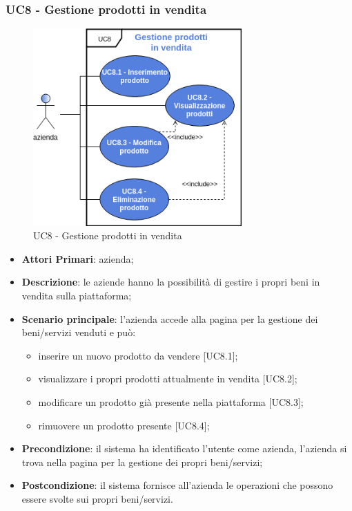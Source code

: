 \subsubsection{UC8 - Gestione prodotti in vendita}
\begin{figure}[h]
	\includegraphics[width=8cm]{res/images/UC8-Generale.png}
	\centering
	\caption{UC8 - Gestione prodotti in vendita}
\end{figure}
\begin{itemize}
	\item \textbf{Attori Primari}: azienda;
	\item \textbf{Descrizione}: le aziende hanno la possibilità di gestire i propri beni in vendita sulla piattaforma;
	\item \textbf{Scenario principale}: l'azienda accede alla pagina per la gestione dei beni/servizi venduti e può:
	\begin{itemize}
		\item inserire un nuovo prodotto da vendere [UC8.1];
		\item visualizzare i propri prodotti attualmente in vendita [UC8.2];
		\item modificare un prodotto già presente nella piattaforma [UC8.3];
		\item rimuovere un prodotto presente [UC8.4]; 
	\end{itemize}
	\item \textbf{Precondizione}: il sistema ha identificato l'utente come azienda, l'azienda si trova nella pagina per la gestione dei propri beni/servizi;
	\item \textbf{Postcondizione}: il sistema fornisce all'azienda le operazioni che possono essere svolte sui propri beni/servizi.	
\end{itemize}

